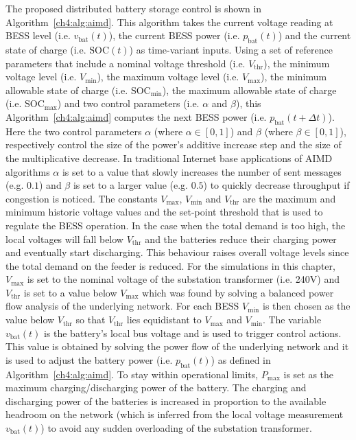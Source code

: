 The proposed distributed battery storage control is shown in Algorithm~\ref{ch4:alg:aimd}.
This algorithm takes the current voltage reading at BESS level (i.e. $v_\text{bat}(t)$), the current BESS power (i.e. $p_\text{bat}(t)$) and the current state of charge (i.e. $\text{SOC}(t)$) as time-variant inputs.
Using a set of reference parameters that include a nominal voltage threshold (i.e. $V_\text{thr}$), the minimum voltage level (i.e. $V_\text{min}$), the maximum voltage level (i.e. $V_\text{max}$), the minimum allowable state of charge (i.e. $\text{SOC}_\text{min}$), the maximum allowable state of charge (i.e. $\text{SOC}_\text{max}$) and two control parameters (i.e. $\alpha$ and $\beta$), this Algorithm~\ref{ch4:alg:aimd} computes the next BESS power (i.e. $p_\text{bat}(t + \Delta t)$).
Here the two control parameters $\alpha$ (where $\alpha \in [0, 1]$) and $\beta$ (where $\beta \in [0, 1]$), respectively control the size of the power's additive increase step and the size of the multiplicative decrease.
In traditional Internet base applications of AIMD algorithms $\alpha$ is set to a value that slowly increases the number of sent messages (e.g. $0.1$) and $\beta$ is set to a larger value (e.g. $0.5$) to quickly decrease throughput if congestion is noticed.
The constants $V_\text{max}$, $V_\text{min}$ and $V_\text{thr}$ are the maximum and minimum historic voltage values and the set-point threshold that is used to regulate the BESS operation.
In the case when the total demand is too high, the local voltages will fall below $V_\text{thr}$ and the batteries reduce their charging power and eventually start discharging.
This behaviour raises overall voltage levels since the total demand on the feeder is reduced.
For the simulations in this chapter, $V_\text{max}$ is set to the nominal voltage of the substation transformer (i.e. 240V) and $V_\text{thr}$ is set to a value below $V_\text{max}$ which was found by solving a balanced power flow analysis of the underlying network.
For each BESS $V_\text{min}$ is then chosen as the value below $V_\text{thr}$ so that $V_\text{thr}$ lies equidistant to $V_\text{max}$ and $V_\text{min}$.
The variable $v_\text{bat}(t)$ is the battery's local bus voltage and is used to trigger control actions.
This value is obtained by solving the power flow of the underlying network and it is used to adjust the battery power (i.e. $p_\text{bat}(t)$) as defined in Algorithm~\ref{ch4:alg:aimd}.
To stay within operational limits, $P_\text{max}$ is set as the maximum charging/discharging power of the battery.
The charging and discharging power of the batteries is increased in proportion to the available headroom on the network (which is inferred from the local voltage measurement $v_\text{bat}(t)$) to avoid any sudden overloading of the substation transformer.

